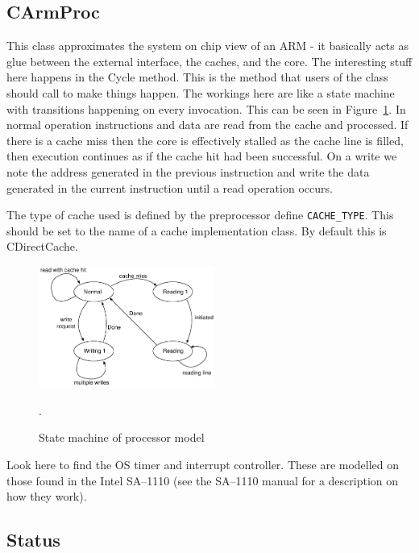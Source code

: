 \documentclass[10pt,a4paper]{article}
\begin{document}
\subsection{CArmProc} %
\label{sec:armproc}   %

This class approximates the system on chip view of an ARM - it 
basically acts as
glue between the external interface, the caches, and the core. The
interesting stuff here happens in the Cycle method. This is the method
that users of the class should call to make things happen. The
workings here are like a state machine with transitions happening on
every invocation. This can be seen in Figure~\ref{fig:state}. In
normal operation instructions and data are read from the cache and
processed. If there is a cache miss then the core is effectively
stalled as the cache line is filled, then execution continues as if
the cache hit had been successful. On a write we note the address
generated in the previous instruction and write the data generated in
the current instruction until a read operation occurs.

The type of cache used is defined by the preprocessor define
\texttt{CACHE\_TYPE}. This should be set to the name of a cache
implementation class. By default this is CDirectCache.

\begin{figure}
\centering
\mbox{\includegraphics[height=4cm]{pics/state}}
\caption{State machine of processor model}.
\label{fig:state}
\end{figure}

Look here to find the OS timer and interrupt controller. These are
modelled on those found in the Intel SA--1110 (see the SA--1110 manual
for a description on how they work).

\subsection{Status} %
\label{sec:status}  %
\end{document}
